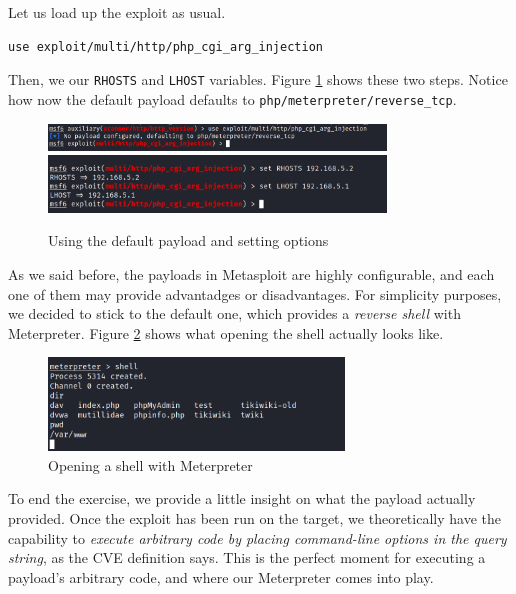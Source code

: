 Let us load up the exploit as usual.

\begin{lstlisting}
use exploit/multi/http/php_cgi_arg_injection
\end{lstlisting}

Then, we  our \texttt{RHOSTS} and \texttt{LHOST} variables. Figure \ref{fig:ex2:use_exploit_cgi_exception+set_exploit_options} shows these two steps. Notice how now the default payload defaults to \texttt{php/meterpreter/reverse\_tcp}.

\begin{figure}[htbp]
    \centering
    \includegraphics[width=0.8\textwidth]{../drawable/exercise_2_screenshots/use_exploit_cgi_exception.png}
    \includegraphics[width=0.8\textwidth]{../drawable/exercise_2_screenshots/set_exploit_options.png}
    \caption{Using the default payload and setting options}
    \label{fig:ex2:use_exploit_cgi_exception+set_exploit_options}
\end{figure}

As we said before, the payloads in Metasploit are highly configurable, and each one of them may provide advantadges or disadvantages. For simplicity purposes, we decided to stick to the default one, which provides a \textit{reverse shell} with Meterpreter. Figure \ref{fig:ex2:shell_opened} shows what opening the shell actually looks like.

\begin{figure}[htbp]
    \centering
    \includegraphics[width=0.7\textwidth]{../drawable/exercise_2_screenshots/shell_opened.png}
    \caption{Opening a shell with Meterpreter}
    \label{fig:ex2:shell_opened}
\end{figure}

To end the exercise, we provide a little insight on what the payload actually provided. Once the exploit has been run on the target, we theoretically have the capability to \textit{execute arbitrary code by placing command-line options in the query string}, as the CVE definition says. This is the perfect moment for executing a payload's arbitrary code, and where our Meterpreter comes into play.

